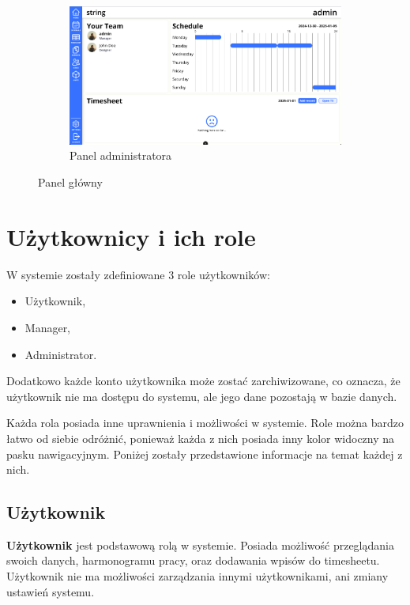 \begin{figure}[H]
\begin{subfigure}{0.40\textwidth}
        \includegraphics[width=\textwidth]{graf/adminDashboard.png}
        \caption{Panel administratora}
        \label{fig:adminDashboard}
    \end{subfigure}
    \caption{Panel główny}
    \label{fig:dashboard}
\end{figure}

\section{Użytkownicy i ich role}

W systemie zostały zdefiniowane 3 role użytkowników:

\begin{itemize}
    \item Użytkownik,
    \item Manager,
    \item Administrator.
\end{itemize}

Dodatkowo każde konto użytkownika może zostać zarchiwizowane, co oznacza, że użytkownik nie ma dostępu do systemu, ale jego dane pozostają w bazie danych.

Każda rola posiada inne uprawnienia i możliwości w systemie. Role można bardzo łatwo od siebie odróżnić, ponieważ każda z nich posiada inny kolor widoczny na pasku nawigacyjnym. Poniżej zostały przedstawione informacje na temat każdej z nich.

\subsection{Użytkownik}

\textbf{Użytkownik} jest podstawową rolą w systemie. Posiada możliwość przeglądania swoich danych, harmonogramu pracy, oraz dodawania wpisów do timesheetu. Użytkownik nie ma możliwości zarządzania innymi użytkownikami, ani zmiany ustawień systemu.

